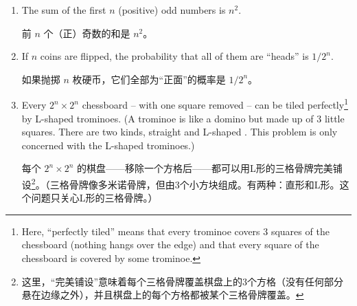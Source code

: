 \begin{enumerate}
\begin{enumerate}
{    前0个正整数的和是 $(0^2 + 0)/2$。或者，如果你喜欢从有东西开始而不是没有：前1个正整数的和是 $(1^2+1)/2$。
    }
    
    \wbvfill
    
    \item The sum of the first $n$ (positive) odd numbers is $n^2$.
    
    前 $n$ 个（正）奇数的和是 $n^2$。
    
    \wbvfill
    
    \item If $n$ coins are flipped, the probability that all of them 
    are ``heads'' is $1/2^n$.
    
    如果抛掷 $n$ 枚硬币，它们全部为“正面”的概率是 $1/2^n$。
    
    \wbvfill
    
    \item Every $2^n \times 2^n$ chessboard -- with one square removed -- can 
    be tiled perfectly\footnote{Here, ``perfectly tiled'' means that every trominoe
    covers 3 squares of the chessboard (nothing hangs over the edge) and that every
    square of the chessboard is covered by some trominoe. } by L-shaped trominoes.
    (A trominoe is like a domino but 
    made up of $3$ little squares.  There are two kinds, straight 
     and L-shaped 
    .  This problem is only concerned with
    the L-shaped trominoes.)
    
    每个 $2^n \times 2^n$ 的棋盘——移除一个方格后——都可以用L形的三格骨牌完美铺设\footnote{这里，“完美铺设”意味着每个三格骨牌覆盖棋盘上的3个方格（没有任何部分悬在边缘之外），并且棋盘上的每个方格都被某个三格骨牌覆盖。}。（三格骨牌像多米诺骨牌，但由3个小方块组成。有两种：直形和L形。这个问题只关心L形的三格骨牌。）
    \end{enumerate}
    

\end{enumerate}
